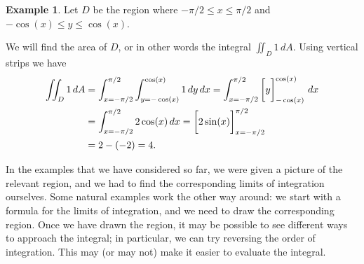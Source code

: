 \documentclass[reqno]{amsart}
\theoremstyle{definition}
\newtheorem{example}[theorem]{Example}
\begin{document}
\begin{example}
 Let $D$ be the region where $-\pi/2\leq x\leq\pi/2$ and
 $-\cos(x)\leq y\leq\cos(x)$. 
 \begin{center}
 \end{center}
 We will find the area of $D$, or in
 other words the integral $\iint_D 1\,dA$.  Using vertical strips we
 have 
 \begin{align*}
  \iint_D 1\,dA
   &= \int_{x=-\pi/2}^{\pi/2} \int_{y=-\cos(x)}^{\cos(x)} 1\,dy\,dx 
    = \int_{x=-\pi/2}^{\pi/2} \CH{ y }_{-\cos(x)}^{\cos(x)}\,dx \\
   &= \int_{x=-\pi/2}^{\pi/2} 2\cos(x)\, dx 
    = \CH{ 2\sin(x) }_{x=-\pi/2}^{\pi/2} \\
   &= 2 - (-2) = 4.
 \end{align*}
\end{example}

In the examples that we have considered so far, we were given a
picture of the relevant region, and we had to find the corresponding
limits of integration ourselves.  Some natural examples work the other
way around: we start with a formula for the limits of integration, and
we need to draw the corresponding region.  Once we have drawn the
region, it may be possible to see different ways to approach the
integral; in particular, we can try reversing the order of
integration.  This may (or may not) make it easier to evaluate the
integral. 
\end{document}
